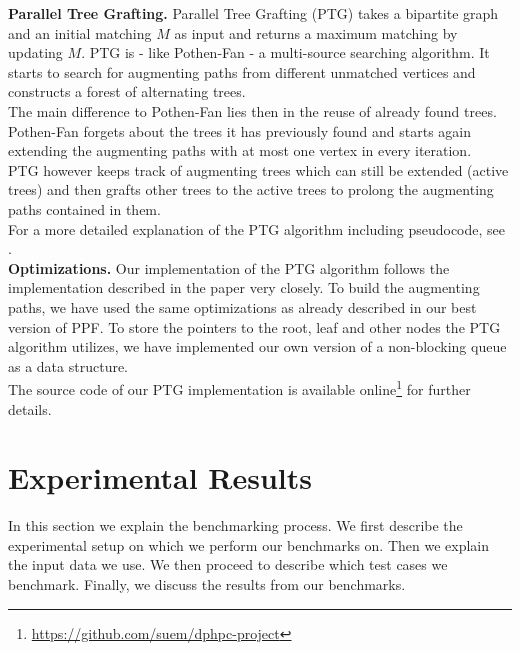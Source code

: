 \documentclass[letterpaper]{article}
\newcommand{\mypar}[1]{{\bf #1.}}
\begin{document}
\mypar{Parallel Tree Grafting} 
Parallel Tree Grafting (PTG) takes a bipartite graph and an initial matching $M$ as input and returns a maximum matching by updating $M$.
PTG is - like Pothen-Fan - a multi-source searching algorithm. It starts to search for augmenting paths from different unmatched vertices and constructs a forest of alternating trees.\\
The main difference to Pothen-Fan lies then in the reuse of already found trees. Pothen-Fan forgets about the trees it has previously found and starts again extending the augmenting paths with at most one vertex in every iteration. \\
PTG however keeps track of augmenting trees which can still be extended (active trees) and then grafts other trees to the active trees to prolong the augmenting paths contained in them.\\
For a more detailed explanation of the PTG algorithm including pseudocode, see \cite{Azad:2015}.\\

\mypar{Optimizations}
Our implementation of the PTG algorithm follows the implementation described in the paper very closely. To build the augmenting paths, we have used the same optimizations as already described in our best version of  PPF. To store the pointers to the root, leaf and other nodes the PTG algorithm utilizes, we have implemented our own version of a non-blocking queue as a data structure. \\
The source code of our PTG implementation is available online\footnote{\url{https://github.com/suem/dphpc-project}} for further details.
\section{Experimental Results}\label{sec:exp}

In this section we explain the benchmarking process. We first describe the experimental setup on which we perform our benchmarks on. Then we explain the input data we use. We then proceed to describe which test cases we benchmark. Finally, we discuss the results from our benchmarks.\\
\end{document}
